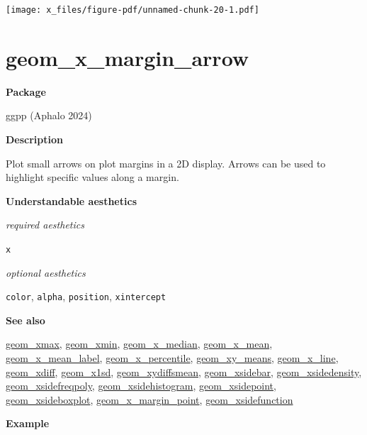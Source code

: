 \documentclass[
  letterpaper,
  DIV=11,
  numbers=noendperiod]{scrreprt}
\begin{document}
\texttt{[image: x\_files/figure-pdf/unnamed-chunk-20-1.pdf]}

\section{geom\_x\_margin\_arrow}\label{x_margin_arrow}

\textbf{Package}

ggpp (Aphalo 2024)

\textbf{Description}

Plot small arrows on plot margins in a 2D display. Arrows can be used to
highlight specific values along a margin.

\textbf{Understandable aesthetics}

\emph{required aesthetics}

\texttt{x}

\emph{optional aesthetics}

\texttt{color}, \texttt{alpha}, \texttt{position}, \texttt{xintercept}

\textbf{See also}

\href{@xmax}{geom\_xmax}, \href{@xmin}{geom\_xmin},
\href{@x_median}{geom\_x\_median}, \href{@x_mean}{geom\_x\_mean},
\href{@x_mean_label}{geom\_x\_mean\_label},
\href{@x_percentile}{geom\_x\_percentile},
\href{@xy_means}{geom\_xy\_means}, \href{@x_line}{geom\_x\_line},
\href{@xdiff}{geom\_xdiff}, \href{@x1sd}{geom\_x1sd},
\href{@xydiffsmean}{geom\_xydiffsmean},
\href{@xsidebar}{geom\_xsidebar},
\href{@xsidedensity}{geom\_xsidedensity},
\href{@xsidefreqpoly}{geom\_xsidefreqpoly},
\href{@xsidehistogram}{geom\_xsidehistogram},
\href{@xsidepoint}{geom\_xsidepoint},
\href{@xsideboxplot}{geom\_xsideboxplot},
\href{@x_margin_point}{geom\_x\_margin\_point},
\href{@xsidefunction}{geom\_xsidefunction}

\textbf{Example}
\end{document}
